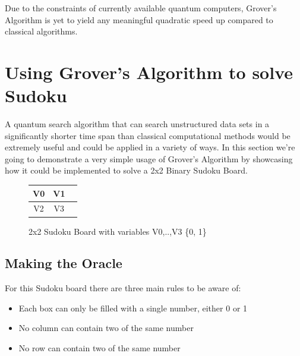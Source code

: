 \documentclass{article}
\begin{document}
\noindent
Due to the constraints of currently available quantum computers, Grover's Algorithm is yet to yield any  meaningful quadratic speed up compared to classical algorithms\cite{noauthor_grovers_2022}.

\pagebreak
\section{Using Grover's Algorithm to solve Sudoku}

A quantum search algorithm that can search unstructured data sets in a significantly shorter time span than classical computational methods would be extremely useful and could be applied in a variety of ways. In this section we're going to demonstrate a very simple usage of Grover's Algorithm by showcasing how it could be implemented to solve a 2x2 Binary Sudoku Board. 

\setlength{\arrayrulewidth}{0.5mm}
\setlength{\tabcolsep}{18pt}
\renewcommand{\arraystretch}{1.5}
\begin{figure}[h]
\begin{center}
    

\begin{tabular}{ |c|c|c| } 
\hline
V0 & V1  \\ 
\hline
V2 & V3 \\ 
\hline
\end{tabular}
\end{center}
\caption{2x2 Sudoku Board with variables V0,..,V3 \in \{0, 1\}}
\label{fig:Sudoku Board}
\end{figure}

\subsection{Making the Oracle}


For this Sudoku board there are three main rules to be aware of:
\begin{itemize}
    \item Each box can only be filled with a single number, either 0 or 1
    \item No column can contain two of the same number
    \item No row can contain two of the same number
\end{itemize}
\end{document}
